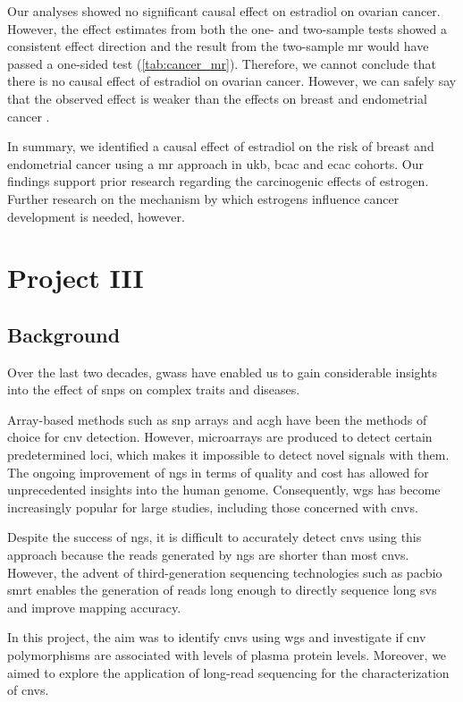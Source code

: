 \documentclass[draft]{scrbook}
\begin{document}
Our analyses showed no significant causal effect on estradiol on ovarian cancer.
However, the effect estimates from both the one- and two-sample tests showed a consistent effect direction and the result from the two-sample \gls{mr} would have passed a one-sided test (\cref{tab:cancer_mr}).
Therefore, we cannot conclude that there is no causal effect of estradiol on ovarian cancer.
However, we can safely say that the observed effect is weaker than the effects on breast and endometrial cancer \cite{Trabert2016,Key2011,Rodriguez2019}.

In summary, we identified a causal effect of estradiol on the risk of breast and endometrial cancer using a \gls{mr} approach in \gls{ukb}, \gls{bcac} and \gls{ecac} cohorts.
Our findings support prior research regarding the carcinogenic effects of estrogen.
Further research on the mechanism by which estrogens influence cancer development is needed, however.

\chapter{Project III}
\section{Background}
Over the last two decades, \glspl{gwas} have enabled us to gain considerable insights into the effect of \glspl{snp} on complex traits and diseases.

Array-based methods such as \gls{snp} arrays and \gls{acgh} have been the methods of choice for \gls{cnv} detection.
However, microarrays are produced to detect certain predetermined loci, which makes it impossible to detect novel signals with them.
The ongoing improvement of \gls{ngs} in terms of quality and cost has allowed for unprecedented insights into the human genome.
Consequently, \gls{wgs} has become increasingly popular for large studies, including those concerned with \glspl{cnv}.

Despite the success of \gls{ngs}, it is difficult to accurately detect \glspl{cnv} using this approach because the reads generated by \gls{ngs} are shorter than most \glspl{cnv}.
However, the advent of third-generation sequencing technologies such as \gls{pacbio} \gls{smrt} enables the generation of reads long enough to directly sequence long \glspl{sv} and improve mapping accuracy.

In this project, the aim was to identify \glspl{cnv} using \gls{wgs} and investigate if \gls{cnv} polymorphisms are associated with levels of plasma protein levels.
Moreover, we aimed to explore the application of long-read sequencing for the characterization of \glspl{cnv}.
\end{document}
